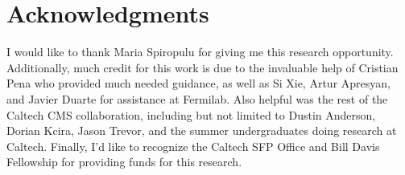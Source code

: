 \documentclass[twocolumn,aps,prd,reprint,superscriptaddress,floatfix]{revtex4-1}
\begin{document}
\section{Acknowledgments}
I would like to thank Maria Spiropulu for giving me this research opportunity. 
Additionally, much credit for this work is due to the invaluable help of Cristian Pena who provided much needed guidance, as well as Si Xie, Artur Apresyan, and Javier Duarte for assistance at Fermilab. 
Also helpful was the rest of the Caltech CMS collaboration, including but not limited to Dustin Anderson, Dorian Kcira, Jason Trevor, and the summer undergraduates doing research at Caltech.
Finally, I'd like to recognize the Caltech SFP Office and Bill Davis Fellowship for providing funds for this research.

\newpage

\nocite{*}

 
\end{document}
